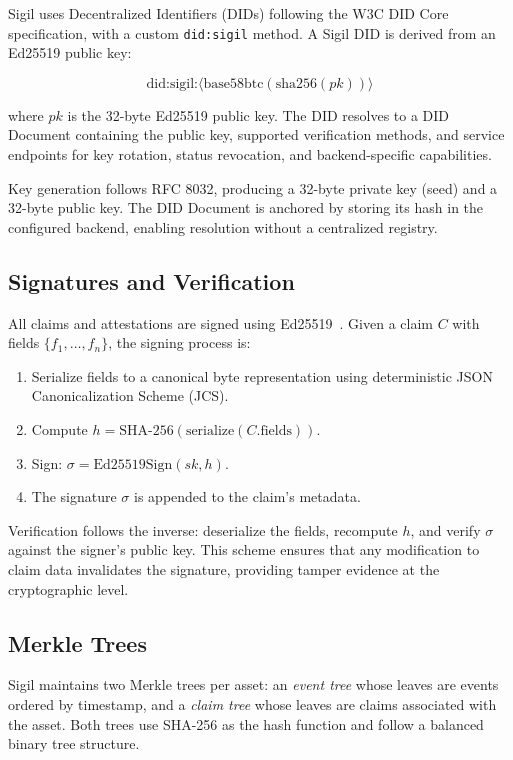 \documentclass[conference]{IEEEtran}
\begin{document}
Sigil uses Decentralized Identifiers (DIDs) following the W3C DID Core
specification, with a custom \texttt{did:sigil} method.  A Sigil DID is
derived from an Ed25519 public key:

\begin{equation}
  \text{did:sigil:}\langle\text{base58btc}(\text{sha256}(pk))\rangle
\end{equation}

where $pk$ is the 32-byte Ed25519 public key.  The DID resolves to a DID
Document containing the public key, supported verification methods, and
service endpoints for key rotation, status revocation, and backend-specific
capabilities.

Key generation follows RFC 8032, producing a 32-byte private key (seed) and a
32-byte public key.  The DID Document is anchored by storing its hash in the
configured backend, enabling resolution without a centralized registry.

\subsection{Signatures and Verification}

All claims and attestations are signed using Ed25519~\cite{bonneau2015}.  Given
a claim $C$ with fields $\{f_1, \ldots, f_n\}$, the signing process is:

\begin{enumerate}
  \item Serialize fields to a canonical byte representation using
        deterministic JSON Canonicalization Scheme (JCS).
  \item Compute $h = \text{SHA-256}(\text{serialize}(C.\text{fields}))$.
  \item Sign: $\sigma = \text{Ed25519Sign}(sk, h)$.
  \item The signature $\sigma$ is appended to the claim's metadata.
\end{enumerate}

Verification follows the inverse: deserialize the fields, recompute
$h$, and verify $\sigma$ against the signer's public key.  This scheme ensures
that any modification to claim data invalidates the signature, providing
tamper evidence at the cryptographic level.

\subsection{Merkle Trees}

Sigil maintains two Merkle trees per asset: an \emph{event tree} whose leaves
are events ordered by timestamp, and a \emph{claim tree} whose leaves are
claims associated with the asset.  Both trees use SHA-256 as the hash function
and follow a balanced binary tree structure.
\end{document}
